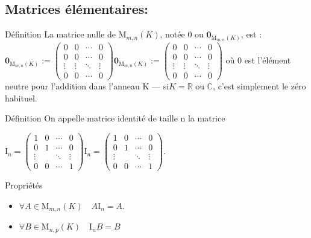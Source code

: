 \documentclass{book}
\begin{document}
\subsection{Matrices élémentaires: }



\begin{Définition}[]{Définition}{}
    La matrice nulle de ${\displaystyle \mathrm {M} _{m,n}\left(K\right)}$, notée 0 ou ${\displaystyle \mathbf {0} _{\mathrm {M} _{m,n}\left(K\right)}}$, est :
${\displaystyle \mathbf {0} _{\mathrm {M} _{m,n}\left(K\right)}:={\begin{pmatrix}0&0&\cdots &0\\0&0&\cdots &0\\\vdots &\vdots &\ddots &\vdots \\0&0&\cdots &0\end{pmatrix}}}{\displaystyle \mathbf {0} _{\mathrm {M} _{m,n}\left(K\right)}:={\begin{pmatrix}0&0&\cdots &0\\0&0&\cdots &0\\\vdots &\vdots &\ddots &\vdots \\0&0&\cdots &0\end{pmatrix}}}$
où 0 est l'élément neutre pour l'addition dans l'anneau K — si$ {\displaystyle K=\mathbb {R}}$ ou ${\displaystyle \mathbb {C}}$, c’est simplement le zéro habituel.
\end{Définition}
\begin{Définition}[]{Définition}{}
On appelle matrice identité de taille n la matrice

${\displaystyle \mathrm {I} _{n}={\begin{pmatrix}1&0&\cdots &0\\0&1&\cdots &0\\\vdots &\ &\ddots &\vdots \\0&0&\cdots &1\end{pmatrix}}}{\displaystyle \mathrm {I} _{n}={\begin{pmatrix}1&0&\cdots &0\\0&1&\cdots &0\\\vdots &\ &\ddots &\vdots \\0&0&\cdots &1\end{pmatrix}}}.$
\end{Définition}
\begin{Propriété}[]{Propriétés}{}
    \begin{itemize}
        \item ${\displaystyle \forall A\in \mathrm {M} _{m,n}\left(K\right)\quad A\mathrm {I} _{n}=A}.$
        \item ${\displaystyle \forall B\in \mathrm {M} _{n,p}\left(K\right)\quad \mathrm {I} _{n}B=B}$
    \end{itemize}
\end{Propriété}
\end{document}
